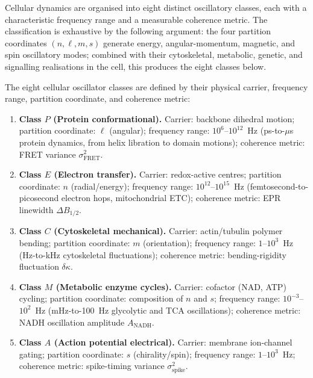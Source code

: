 Cellular dynamics are organised into eight distinct oscillatory classes, each
with a characteristic frequency range and a measurable coherence metric.  The
classification is exhaustive by the following argument: the four partition
coordinates $(n, \ell, m, s)$ generate energy, angular-momentum, magnetic, and
spin oscillatory modes; combined with their cytoskeletal, metabolic, genetic,
and signalling realisations in the cell, this produces the eight classes below.

\begin{definition}
\label{def:eight-classes}
The eight cellular oscillator classes are defined by their physical carrier,
frequency range, partition coordinate, and coherence metric:
\begin{enumerate}[label=(\alph*)]
    \item \textbf{Class $P$ (Protein conformational).}  Carrier: backbone dihedral
          motion; partition coordinate: $\ell$ (angular); frequency range:
          $10^6$--$10^{12}$~Hz (ps-to-$\mu$s protein dynamics, from helix libration
          to domain motions); coherence metric: FRET variance
          $\sigma^2_\mathrm{FRET}$.

    \item \textbf{Class $E$ (Electron transfer).}  Carrier: redox-active centres;
          partition coordinate: $n$ (radial/energy); frequency range:
          $10^{12}$--$10^{15}$~Hz (femtosecond-to-picosecond electron hops,
          mitochondrial ETC); coherence metric: EPR linewidth $\Delta B_{1/2}$.

    \item \textbf{Class $C$ (Cytoskeletal mechanical).}  Carrier: actin/tubulin
          polymer bending; partition coordinate: $m$ (orientation); frequency
          range: $1$--$10^3$~Hz (Hz-to-kHz cytoskeletal fluctuations); coherence
          metric: bending-rigidity fluctuation $\delta\kappa$.

    \item \textbf{Class $M$ (Metabolic enzyme cycles).}  Carrier: cofactor (NAD,
          ATP) cycling; partition coordinate: composition of $n$ and $s$;
          frequency range: $10^{-3}$--$10^2$~Hz (mHz-to-100~Hz glycolytic and
          TCA oscillations); coherence metric: NADH oscillation amplitude
          $A_\mathrm{NADH}$.

    \item \textbf{Class $A$ (Action potential electrical).}  Carrier: membrane
          ion-channel gating; partition coordinate: $s$ (chirality/spin);
          frequency range: $1$--$10^3$~Hz; coherence metric: spike-timing
          variance $\sigma^2_\mathrm{spike}$.


\end{enumerate}
\end{definition}
